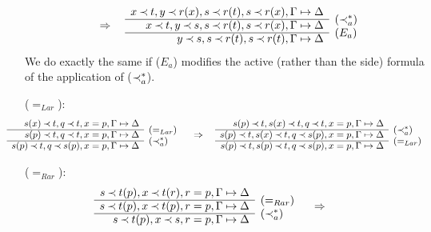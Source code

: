 \begin{PROOF}
\begin{LS}
\[  \conv
 \begin{array}{rl}
x\Incl t, y\Incl r(x), s\Incl r(t), s\Incl r(x),\GSD \\ \cline{1-1}
x\Incl t, y\Incl s, s\Incl r(t), s\Incl r(x),\GSD  & \rabove{(\Incl_a^*)} \\ \cline{1-1}
          y\Incl s, s\Incl r(t), s\Incl r(t),\GSD  & \rabove{(E_a)} \end{array} \]
%
We do exactly the same if ($E_a$) modifies the active (rather than the side)
formula of the application of ($\mathbin{\prec}_a^*$).
\item ($=_{Lar}$): 
\[ \hspace*{-2em}\begin{array}{rl}
s(x)\Incl t, q\Incl t, x=p, \GSD \\ \cline{1-1}
s(p)\Incl t, q\Incl t, x=p, \GSD & \rabove{(=_{Lar})} \\ \cline{1-1}
s(p)\Incl t, q\Incl s(p), x=p, \GSD & \rabove{(\Incl_a^*)} \end{array} \conv
\begin{array}{rl}
s(p)\Incl t,s(x)\Incl t, q\Incl t, x=p, \GSD \\ \cline{1-1}
s(p)\Incl t,s(x)\Incl t, q\Incl s(p), x=p, \GSD & \rabove{(\Incl_a^*)} \\ \cline{1-1}
s(p)\Incl t,s(p)\Incl t, q\Incl s(p), x=p, \GSD & \rabove{(=_{Lar})} \end{array}
\]
\item ($=_{Rar}$):
\[ \hspace*{-2em} \begin{array}{rl}
s\Incl t(p), x\Incl t(r), r=p, \GSD \\ \cline{1-1}
s\Incl t(p), x\Incl t(p), r=p, \GSD & \rabove{(=_{Rar})}\\ \cline{1-1}
s\Incl t(p), x\Incl s, r=p, \GSD & \rabove{(\Incl_a^*)} \end{array} \conv
\]
\end{LS}
\end{PROOF}
